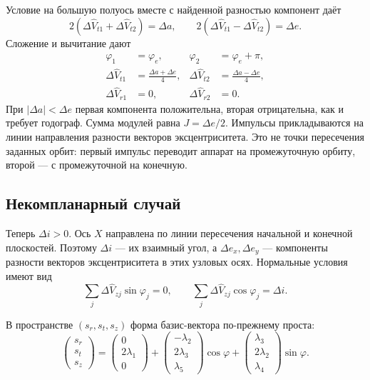 Условие на большую полуось вместе с найденной разностью компонент даёт
\[
 2(\Delta\widehat V_{t1}+\Delta\widehat V_{t2})=\Delta a,\qquad
 2(\Delta\widehat V_{t1}-\Delta\widehat V_{t2})=\Delta e.
\]
Сложение и вычитание дают
\begin{equation}
 \boxed{\begin{aligned}
 \varphi_1&=\varphi_e,&\varphi_2&=\varphi_e+\pi,\\
 \Delta\widehat V_{t1}&=\frac{\Delta a+\Delta e}{4},&
 \Delta\widehat V_{t2}&=\frac{\Delta a-\Delta e}{4},\\
 \Delta\widehat V_{r1}&=0,&\Delta\widehat V_{r2}&=0.
 \end{aligned}}
 \label{eq:planar-impulses}
\end{equation}
При $|\Delta a|<\Delta e$ первая компонента положительна,
вторая отрицательна, как и требует годограф.
Сумма модулей равна $J=\Delta e/2$.
Импульсы прикладываются на линии направления разности векторов
эксцентриситета. Это не точки пересечения заданных орбит:
первый импульс переводит аппарат на промежуточную орбиту,
второй --- с промежуточной на конечную.


\subsection{Некомпланарный случай}
\label{sec:spatial}

Теперь $\Delta i>0$. Ось $X$ направлена по линии пересечения
начальной и конечной плоскостей. Поэтому $\Delta i$ --- их взаимный
угол, а $\Delta e_x,\Delta e_y$ --- компоненты разности векторов
эксцентриситета в этих узловых осях. Нормальные условия имеют вид
\begin{equation}
 \sum_j\Delta\widehat V_{zj}\sin\varphi_j=0,\qquad
 \sum_j\Delta\widehat V_{zj}\cos\varphi_j=\Delta i.
 \label{eq:plane-change-boundaries}
\end{equation}

В пространстве $(s_r,s_t,s_z)$ форма базис-вектора по-прежнему проста:
\begin{equation}
 \begin{pmatrix}s_r\\s_t\\s_z\end{pmatrix}
 =\begin{pmatrix}0\\2\lambda_1\\0\end{pmatrix}
 +\begin{pmatrix}-\lambda_2\\2\lambda_3\\\lambda_5\end{pmatrix}\cos\varphi
 +\begin{pmatrix}\lambda_3\\2\lambda_2\\\lambda_4\end{pmatrix}\sin\varphi.
 \label{eq:spatial-hodograph}
\end{equation}

